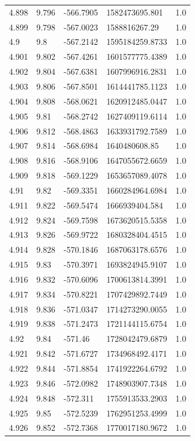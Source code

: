 \begin{tabular}{lllll}
4.898 & 9.796 & -566.7905 & 1582473695.801 & 1.0 \\
4.899 & 9.798 & -567.0023 & 1588816267.29 & 1.0 \\
4.9 & 9.8 & -567.2142 & 1595184259.8733 & 1.0 \\
4.901 & 9.802 & -567.4261 & 1601577775.4389 & 1.0 \\
4.902 & 9.804 & -567.6381 & 1607996916.2831 & 1.0 \\
4.903 & 9.806 & -567.8501 & 1614441785.1123 & 1.0 \\
4.904 & 9.808 & -568.0621 & 1620912485.0447 & 1.0 \\
4.905 & 9.81 & -568.2742 & 1627409119.6114 & 1.0 \\
4.906 & 9.812 & -568.4863 & 1633931792.7589 & 1.0 \\
4.907 & 9.814 & -568.6984 & 1640480608.85 & 1.0 \\
4.908 & 9.816 & -568.9106 & 1647055672.6659 & 1.0 \\
4.909 & 9.818 & -569.1229 & 1653657089.4078 & 1.0 \\
4.91 & 9.82 & -569.3351 & 1660284964.6984 & 1.0 \\
4.911 & 9.822 & -569.5474 & 1666939404.584 & 1.0 \\
4.912 & 9.824 & -569.7598 & 1673620515.5358 & 1.0 \\
4.913 & 9.826 & -569.9722 & 1680328404.4515 & 1.0 \\
4.914 & 9.828 & -570.1846 & 1687063178.6576 & 1.0 \\
4.915 & 9.83 & -570.3971 & 1693824945.9107 & 1.0 \\
4.916 & 9.832 & -570.6096 & 1700613814.3991 & 1.0 \\
4.917 & 9.834 & -570.8221 & 1707429892.7449 & 1.0 \\
4.918 & 9.836 & -571.0347 & 1714273290.0055 & 1.0 \\
4.919 & 9.838 & -571.2473 & 1721144115.6754 & 1.0 \\
4.92 & 9.84 & -571.46 & 1728042479.6879 & 1.0 \\
4.921 & 9.842 & -571.6727 & 1734968492.4171 & 1.0 \\
4.922 & 9.844 & -571.8854 & 1741922264.6792 & 1.0 \\
4.923 & 9.846 & -572.0982 & 1748903907.7348 & 1.0 \\
4.924 & 9.848 & -572.311 & 1755913533.2903 & 1.0 \\
4.925 & 9.85 & -572.5239 & 1762951253.4999 & 1.0 \\
4.926 & 9.852 & -572.7368 & 1770017180.9672 & 1.0 \\

\end{tabular}

